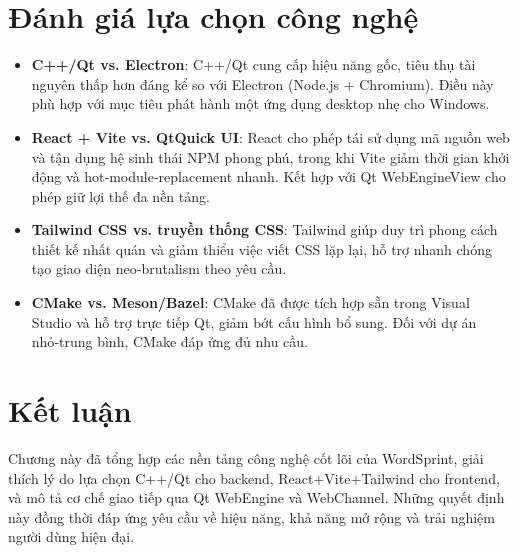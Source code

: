\section{Đánh giá lựa chọn công nghệ}
\label{sec:comparison}
\begin{itemize}
    \item \textbf{C++/Qt vs. Electron}: C++/Qt cung cấp hiệu năng gốc, tiêu thụ tài nguyên thấp hơn đáng kể so với Electron (Node.js + Chromium). Điều này phù hợp với mục tiêu phát hành một ứng dụng desktop nhẹ cho Windows.
    \item \textbf{React + Vite vs. QtQuick UI}: React cho phép tái sử dụng mã nguồn web và tận dụng hệ sinh thái NPM phong phú, trong khi Vite giảm thời gian khởi động và hot‑module‑replacement nhanh. Kết hợp với Qt WebEngineView cho phép giữ lợi thế đa nền tảng.
    \item \textbf{Tailwind CSS vs. truyền thống CSS}: Tailwind giúp duy trì phong cách thiết kế nhất quán và giảm thiểu việc viết CSS lặp lại, hỗ trợ nhanh chóng tạo giao diện neo‑brutalism theo yêu cầu.
    \item \textbf{CMake vs. Meson/Bazel}: CMake đã được tích hợp sẵn trong Visual Studio và hỗ trợ trực tiếp Qt, giảm bớt cấu hình bổ sung. Đối với dự án nhỏ‑trung bình, CMake đáp ứng đủ nhu cầu.
\end{itemize}

\section{Kết luận}
\label{sec:conclusion}
Chương này đã tổng hợp các nền tảng công nghệ cốt lõi của WordSprint, giải thích lý do lựa chọn C++/Qt cho backend, React+Vite+Tailwind cho frontend, và mô tả cơ chế giao tiếp qua Qt WebEngine và WebChannel. Những quyết định này đồng thời đáp ứng yêu cầu về hiệu năng, khả năng mở rộng và trải nghiệm người dùng hiện đại.
